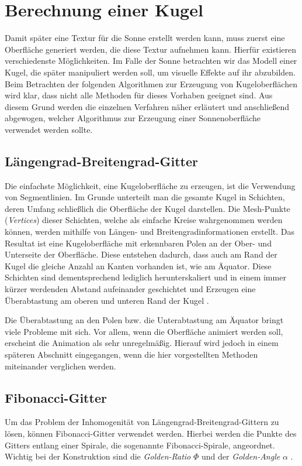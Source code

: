 \section{Berechnung einer Kugel}
Damit später eine Textur für die Sonne erstellt werden kann, muss zuerst eine
Oberfläche generiert werden, die diese Textur aufnehmen kann. Hierfür existieren
verschiedenste Möglichkeiten. Im Falle der Sonne betrachten wir das Modell einer
Kugel, die später manipuliert werden soll, um visuelle Effekte auf ihr
abzubilden. Beim Betrachten der folgenden Algorithmen zur Erzeugung von
Kugeloberflächen wird klar, dass nicht alle Methoden für dieses Vorhaben
geeignet sind. Aus diesem Grund werden die einzelnen Verfahren näher erläutert
und anschließend abgewogen, welcher Algorithmus zur Erzeugung einer
Sonnenoberfläche verwendet werden sollte.

\subsection{Längengrad-Breitengrad-Gitter}
Die einfachste Möglichkeit, eine Kugeloberfläche zu erzeugen, ist die Verwendung
von Segmentlinien. Im Grunde unterteilt man die gesamte Kugel in Schichten,
deren Umfang schließlich die Oberfläche der Kugel darstellen. Die Mesh-Punkte
(\textit{Vertices}) dieser Schichten, welche als einfache Kreise wahrgenommen
werden können, werden mithilfe von Längen- und Breitengradinformationen
erstellt. Das Resultat ist eine Kugeloberfläche mit erkennbaren Polen an der
Ober- und Unterseite der Oberfläche. Diese entstehen dadurch, dass auch am Rand
der Kugel die gleiche Anzahl an Kanten vorhanden ist, wie am Äquator. Diese
Schichten sind dementsprechend lediglich herunterskaliert und in einem immer
kürzer werdenden Abstand aufeinander geschichtet und Erzeugen eine Überabtastung
am oberen und unteren Rand der Kugel \cite{Gonzalez2009}.

Die Überabtastung an den Polen bzw. die Unterabtastung am Äquator bringt viele
Probleme mit sich. Vor allem, wenn die Oberfläche animiert werden soll,
erscheint die Animation als sehr unregelmäßig. Hierauf wird jedoch in einem
späteren Abschnitt eingegangen, wenn die hier vorgestellten Methoden miteinander
verglichen werden.

\subsection{Fibonacci-Gitter}
Um das Problem der Inhomogenität von Längengrad-Breitengrad-Gittern zu lösen,
können Fibonacci-Gitter verwendet werden. Hierbei werden die Punkte des Gitters
entlang einer Spirale, die sogenannte Fibonacci-Spirale, angeordnet. Wichtig bei
der Konstruktion sind die \textit{Golden-Ratio} $\Phi$ und der
\textit{Golden-Angle} $\alpha$ \cite{Gonzalez2009, Marques2013}.

